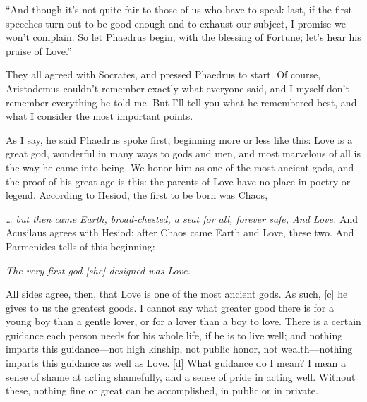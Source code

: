 “And though it's not quite fair to those of us who have to speak last,
if the first speeches turn out to be good enough and to exhaust our
subject, I promise we won't complain. So let Phaedrus begin, with the
blessing of Fortune; let's hear his praise of Love.”

They all agreed with Socrates, and pressed Phaedrus to start. Of course,
Aristodemus couldn't remember exactly what everyone
said, and I myself don't remember everything he told me. But I'll tell
you what he remembered best, and what I consider the most important
points.

As I say, he said Phaedrus spoke first, beginning more or less like
this:
\blank[line]
Love is a great god, wonderful in many ways to gods and men, and most
marvelous of all is the way he came into being. We honor him as one of
the most ancient gods, and the proof of his great age is this: the 
parents of Love have no place in poetry or legend. According to
Hesiod, the first to be born was Chaos,

\startpoem
{\em \ldots{} but then came
Earth, broad-chested, a seat for all, forever safe, 
And Love.}
\stoppoem
{}
And Acusilaus agrees with Hesiod: after Chaos came Earth and Love, these
two. And Parmenides
tells of this beginning:\crlf
\crlf

{\em The very first god {[}she{]} designed was
Love.}\crlf
\crlf

All sides agree, then, that Love is one of the most ancient gods. As
such, {[}c{]} he gives to us the greatest goods. I cannot say what
greater good there is for a young boy than a gentle lover, or for a
lover than a boy to love. There is a certain guidance each person needs
for his whole life, if he is to live well; and nothing imparts this
guidance---not high kinship, not public honor, not wealth---nothing
imparts this guidance as well as Love. {[}d{]} What guidance do I mean?
I mean a sense of shame at acting shamefully, and a sense of pride in
acting well. Without these, nothing fine or great can be accomplished,
in public or in private.

